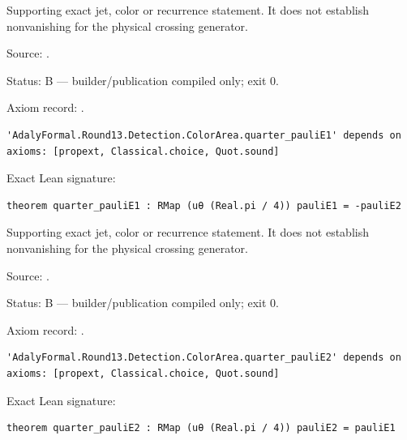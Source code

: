 \begin{theorem}[bp-524]
\label{bp-524}
\uses{}
\leanok
Supporting exact jet, color or recurrence statement. It does not establish nonvanishing for the physical crossing generator.

\par Source: \texttt{}.
\par Status: B — builder/publication compiled only; exit 0.
\par Axiom record: \texttt{}.
\begin{verbatim}
'AdalyFormal.Round13.Detection.ColorArea.quarter_pauliE1' depends on axioms: [propext, Classical.choice, Quot.sound]
\end{verbatim}
\par Exact Lean signature:
\begin{verbatim}
theorem quarter_pauliE1 : RMap (uθ (Real.pi / 4)) pauliE1 = -pauliE2
\end{verbatim}
\end{theorem}

\begin{theorem}[bp-525]
\label{bp-525}
\uses{}
\leanok
Supporting exact jet, color or recurrence statement. It does not establish nonvanishing for the physical crossing generator.

\par Source: \texttt{}.
\par Status: B — builder/publication compiled only; exit 0.
\par Axiom record: \texttt{}.
\begin{verbatim}
'AdalyFormal.Round13.Detection.ColorArea.quarter_pauliE2' depends on axioms: [propext, Classical.choice, Quot.sound]
\end{verbatim}
\par Exact Lean signature:
\begin{verbatim}
theorem quarter_pauliE2 : RMap (uθ (Real.pi / 4)) pauliE2 = pauliE1
\end{verbatim}
\end{theorem}

